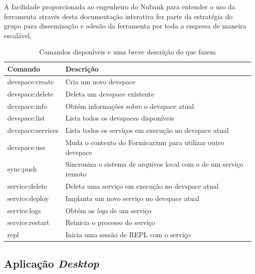     A facilidade proporcionada ao engenheiro do Nubank para entender o uso da ferramenta através desta documentação interativa fez parte da estratégia do grupo para disseminação e adesão da ferramenta por toda a empresa de maneira escalável.


    
    \begin{table}[ht]
    \centering
    \begin{tabular}{l l}
    Comando & Descrição \\
    \hline
      devspace:create    & Cria um novo devspace \\
      devspace:delete    & Deleta um devspace existente \\
      devspace:info      & Obtém informações sobre o devspace atual \\
      devspace:list      & Lista todos os devspaces disponíveis \\
      devspace:services  & Lista todos os serviços em execução no devspace atual \\
      devspace:use       & Muda o contexto do Formicarium para utilizar outro devspace \\
      sync:push          & Sincroniza o sistema de arquivos local com o de um serviço remoto \\
      service:delete     & Deleta uma serviço em execução no devspace atual \\
      service:deploy     & Implanta um novo serviço no devspace atual \\
      service:logs       & Obtém os \textit{logs} de um serviço \\
      service:restart    & Reinicia o processo do serviço \\
      repl               & Inicia uma sessão de REPL com o serviço \\
    \end{tabular}
    \caption{Comandos disponíveis e uma breve descrição do que fazem}
    \label{tab:roles}
    \end{table}

    \subsection{Aplicação \textit{Desktop}}

